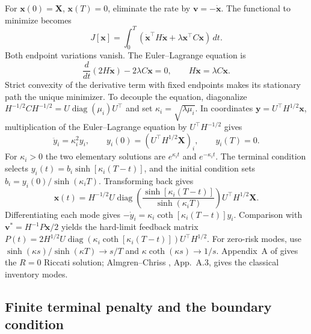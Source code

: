 For $\mathbf x(0)=\mathbf X$, $\mathbf x(T)=0$, eliminate the rate by
$\mathbf v=-\dot{\mathbf x}$. The functional to minimize becomes
\[
 J[\mathbf x]=\int_0^T
 (\dot{\mathbf x}^\top H\dot{\mathbf x}
 +\lambda\mathbf x^\top C\mathbf x)\,dt.
\]
Both endpoint variations vanish. The Euler--Lagrange equation is
\[
 \frac{d}{dt}(2H\dot{\mathbf x})-2\lambda C\mathbf x=0,
 \qquad H\ddot{\mathbf x}=\lambda C\mathbf x.
\]
Strict convexity of the derivative term with fixed endpoints makes its
stationary path the unique minimizer. To decouple the equation, diagonalize
$H^{-1/2}CH^{-1/2}=U\operatorname{diag}(\mu_i)U^\top$ and set
$\kappa_i=\sqrt{\lambda\mu_i}$. In coordinates
$\mathbf y=U^\top H^{1/2}\mathbf x$, multiplication of the
Euler--Lagrange equation by $U^\top H^{-1/2}$ gives
\[
 \ddot y_i=\kappa_i^2y_i,\qquad
 y_i(0)=(U^\top H^{1/2}\mathbf X)_i,\qquad y_i(T)=0.
\]
For $\kappa_i>0$ the two elementary solutions are
$e^{\kappa_i t}$ and $e^{-\kappa_i t}$. The terminal condition selects
$y_i(t)=b_i\sinh[\kappa_i(T-t)]$, and the initial condition sets
$b_i=y_i(0)/\sinh(\kappa_iT)$. Transforming back gives
\begin{equation}
 \mathbf x(t)=H^{-1/2}U\operatorname{diag}\!\left(
 \frac{\sinh[\kappa_i(T-t)]}{\sinh(\kappa_iT)}\right)U^\top H^{1/2}\mathbf X.
 \label{eq:traj}
\end{equation}
Differentiating each mode gives
$-\dot y_i=\kappa_i\coth[\kappa_i(T-t)]y_i$. Comparison with
$\mathbf v^*=H^{-1}P\mathbf x/2$ yields the hard-limit feedback matrix
$P(t)=2H^{1/2}U\operatorname{diag}(\kappa_i\coth[\kappa_i(T-t)])U^\top H^{1/2}$.
For zero-risk modes, use
$\sinh(\kappa s)/\sinh(\kappa T)\to s/T$ and
$\kappa\coth(\kappa s)\to1/s$.
Appendix~A of \cite{bergault2022} gives the $R=0$ Riccati solution;
Almgren--Chriss \cite{almgrenchriss2000}, App.~A.3, gives the classical
inventory modes.

\subsection*{Finite terminal penalty and the boundary condition}

